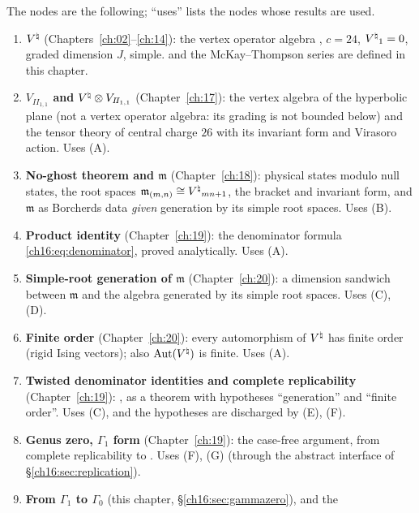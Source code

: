 The nodes are the following; ``uses'' lists the nodes whose results are used.
\begin{enumerate}[label=(\Alph*)]
\item\label{ch16:node:A} \textbf{${V^{\natural}}$} (Chapters~\ref{ch:02}--\ref{ch:14}): the vertex operator algebra
  , $c=24$, ${V^{\natural}}_1=0$, graded dimension $J$, simple.   and the McKay--Thompson series are
  defined in this chapter.
\item\label{ch16:node:B} \textbf{$V_{I\!I_{1,1}}$ and ${V^{\natural}}\otimes V_{I\!I_{1,1}}$} (Chapter~\ref{ch:17}): the vertex
  algebra of the hyperbolic plane (not a vertex operator algebra: its grading is not bounded below) and the tensor
  theory of central charge $26$ with its invariant form and Virasoro action.  Uses (A).
\item\label{ch16:node:C} \textbf{No-ghost theorem and $\mathfrak m$} (Chapter~\ref{ch:18}): physical states modulo null
  states, the root spaces $\mathfrak m_{(m,n)}\cong{V^{\natural}}_{mn+1}$, the bracket and invariant form, and $\mathfrak m$ as
  Borcherds data \emph{given} generation by its simple root spaces.  Uses (B).
\item\label{ch16:node:D} \textbf{Product identity} (Chapter~\ref{ch:19}): the denominator formula
  \eqref{ch16:eq:denominator}, proved analytically.  Uses (A).
\item\label{ch16:node:E} \textbf{Simple-root generation of $\mathfrak m$} (Chapter~\ref{ch:20}): a dimension sandwich
  between $\mathfrak m$ and the algebra generated by its simple root spaces.  Uses (C), (D).
\item\label{ch16:node:F} \textbf{Finite order} (Chapter~\ref{ch:20}): every automorphism of ${V^{\natural}}$ has finite order
  (rigid Ising vectors); also $\operatorname{Aut}({V^{\natural}})$ is finite.  Uses (A).
\item\label{ch16:node:G} \textbf{Twisted denominator identities and complete replicability} (Chapter~\ref{ch:19}):
  , as a theorem with hypotheses ``generation'' and ``finite order''.  Uses (C), and the
  hypotheses are discharged by (E), (F).
\item\label{ch16:node:H} \textbf{Genus zero, $\Gamma_1$ form} (Chapter~\ref{ch:19}): the case-free argument, from complete
  replicability to .  Uses (F), (G) (through the abstract interface of
  \S\ref{ch16:sec:replication}).
\item\label{ch16:node:I} \textbf{From $\Gamma_1$ to $\Gamma_0$} (this chapter, \S\ref{ch16:sec:gammazero}), and the

\end{enumerate}
